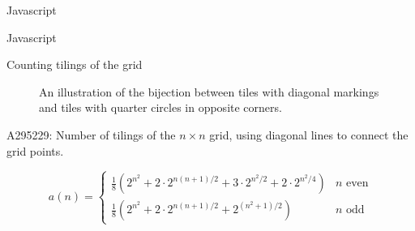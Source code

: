 \documentclass{beamer}%
\begin{document}
\begin{frame}{Javascript} %
\end{frame}

\begin{frame}{Javascript} %
\end{frame}

\begin{frame}{Counting tilings of the grid} %
  \begin{figure}
    
    \caption{An illustration of the bijection between tiles with diagonal markings and tiles with quarter circles in opposite corners.}
  \end{figure}
\end{frame}

\begin{frame}{A295229: Number of tilings of the $n \times n$ grid, using diagonal lines to connect the grid points.}
  
  \[
    a(n) = \begin{cases}
      \frac 18 (2^{n^2} + 2\cdot2^{n(n+1)/2} + 3\cdot2^{n^2/2} + 2\cdot2^{n^2/4}) & n \text{ even} \\
      \frac 18 (2^{n^2} + 2\cdot2^{n(n+1)/2} + 2^{(n^2+1)/2}) & n \text{ odd}
    \end{cases}
  \]
\end{frame}
\end{document}
